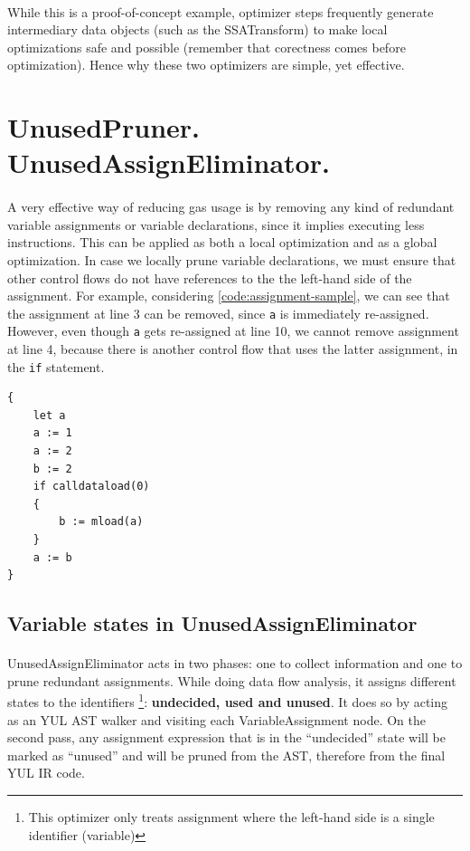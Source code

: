 \paragraph*{}
While this is a proof-of-concept example, optimizer steps frequently generate intermediary data objects (such as the SSATransform) to make local optimizations safe and possible (remember that corectness comes before optimization). Hence why these two optimizers are simple, yet effective.

\section{UnusedPruner. UnusedAssignEliminator.}
\paragraph*{}
A very effective way of reducing gas usage is by removing any kind of redundant variable assignments or variable declarations, since it implies executing less instructions. This can be applied as both a local optimization and as a global optimization. In case we locally prune variable declarations, we must ensure that other control flows do not have references to the the left-hand side of the assignment. For example, considering \ref*{code:assignment-sample}, we can see that the assignment at line 3 can be removed, since \lstinline[columns=fixed]{a} is immediately re-assigned. However, even though \lstinline[columns=fixed]{a} gets re-assigned at line 10, we cannot remove assignment at line 4, because there is another control flow that uses the latter assignment, in the \lstinline[columns=fixed]{if} statement. 

\label{code:assignment-sample}
\begin{lstlisting}[caption=YUL IR code sample for variable assignments. Both variables a and b are used in a different control flow.]
{
    let a
    a := 1
    a := 2
    b := 2
    if calldataload(0)
    {
        b := mload(a)
    }
    a := b
}
\end{lstlisting}

\subsection{Variable states in UnusedAssignEliminator}
\paragraph*{}
UnusedAssignEliminator acts in two phases: one to collect information and one to prune redundant assignments. While doing data flow analysis, it assigns different states to the identifiers \footnote{This optimizer only treats assignment where the left-hand side is a single identifier (variable)}: \textbf{undecided, used and unused}. It does so by acting as an YUL AST walker and visiting each VariableAssignment node. On the second pass, any assignment expression that is in the ``undecided'' state will be marked as ``unused'' and will be pruned from the AST, therefore from the final YUL IR code.

